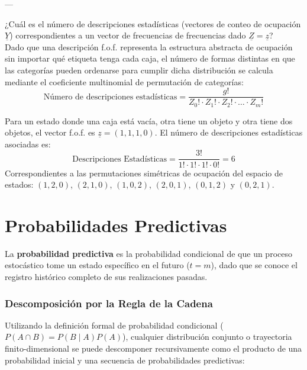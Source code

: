 ---

\begin{ejercicio}
¿Cuál es el número de descripciones estadísticas (vectores de conteo de ocupación $\underline{Y}$) correspondientes a un vector de frecuencias de frecuencias dado $\underline{Z} = \underline{z}$? \\

\noindent
Dado que una descripción f.o.f. representa la estructura abstracta de ocupación sin importar qué etiqueta tenga cada caja, el número de formas distintas en que las categorías pueden ordenarse para cumplir dicha distribución se calcula mediante el coeficiente multinomial de permutación de categorías:
\begin{equation}
    \text{Número de descripciones estadísticas} = \frac{g!}{Z_0! \cdot Z_1! \cdot Z_2! \cdot \dots \cdot Z_m!}
\end{equation}
\end{ejercicio}

\begin{ejemplo}
    Para un estado donde una caja está vacía, otra tiene un objeto y otra tiene dos objetos, el vector f.o.f. es $\underline{z} = (1, 1, 1, 0)$. El número de descripciones estadísticas asociadas es:
    \[
    \text{Descripciones Estadísticas} = \frac{3!}{1! \cdot 1! \cdot 1! \cdot 0!} = 6
    \]
    Correspondientes a las permutaciones simétricas de ocupación del espacio de estados: $(1,2,0)$, $(2,1,0)$, $(1,0,2)$, $(2,0,1)$, $(0,1,2)$ y $(0,2,1)$.
\end{ejemplo}


\section{Probabilidades Predictivas}

\begin{definicion}
La \textbf{probabilidad predictiva} es la probabilidad condicional de que un proceso estocástico tome un estado específico en el futuro ($t=m$), dado que se conoce el registro histórico completo de sus realizaciones pasadas.
\end{definicion}

\subsubsection{Descomposición por la Regla de la Cadena}

Utilizando la definición formal de probabilidad condicional ($P(A \cap B) = P(B \mid A)P(A)$), cualquier distribución conjunto o trayectoria finito-dimensional se puede descomponer recursivamente como el producto de una probabilidad inicial y una secuencia de probabilidades predictivas:

